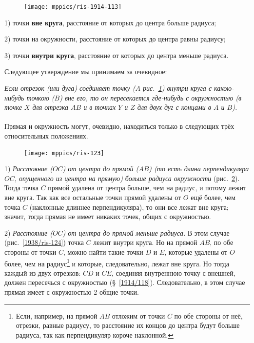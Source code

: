 \documentclass[twoside]{book}
\makeatletter
\newcommand{\rindex}[2][\imki@jobname]{%
  \index[#1]{\detokenize{#2}}%
}
\makeatother
\begin{document}
\begin{figure}
\centering
\texttt{[image: mppics/ris-1914-113]}
\caption{}\label{1914/ris-113}
\end{figure}


1) точки \rindex{внешние точки круга}\textbf{вне круга}, расстояние от которых до центра больше радиуса; 

2) точки на окружности, расстояние от которых до центра равны радиусу; 

3) точки \rindex{внутренние точки круга}\textbf{внутри круга}, расстояние от которых до центра меньше радиуса. 

Следующее утверждение мы принимаем за очевидное:

\emph{Если отрезок (или дуга) соединяет точку \emph{($A$ рис.~\ref{1914/ris-113})} внутри круга с какою-нибудь точкою \emph{($B$)} вне его, то он пересекается где-нибудь с окружностью \emph{(в точке $X$ для отрезка $AB$ и в точках $Y$ и $Z$ для двух дуг с концами в $A$ и $B$)}.}



\paragraph{}\label{1938/112}
Прямая и окружность могут, очевидно, находиться только в следующих трёх относительных положениях.

\begin{figure}
\centering
\texttt{[image: mppics/ris-123]}
\caption{}\label{1938/ris-123}
\end{figure}

1) \emph{Расстояние \emph{($OC$)} от центра до прямой \emph{($AB$) (то есть длина перпендикуляра $OC$, опущенного из центра на прямую)} больше радиуса окружности} (рис.~\ref{1938/ris-123}).
Тогда точка $C$ прямой удалена от центра больше, чем на радиус, и потому лежит вне круга.
Так как все остальные точки прямой удалены от $O$ ещё более, чем точка $C$ (наклонные длиннее перпендикуляра), то они все лежат вне круга;
значит, тогда прямая не имеет никаких точек, общих с окружностью.

2) \emph{Расстояние \emph{($OC$)} от центра до прямой меньше радиуса.}
В этом случае (рис.~\ref{1938/ris-124}) точка $C$ лежит внутри круга. 
Но на прямой $AB$, по обе стороны от точки $C$, можно найти такие точки $D$ и $E$, которые удалены от $O$ более, чем на радиус\footnote{Если, например, на прямой $AB$ отложим от точки $C$ по обе стороны от неё, отрезки, равные радиусу, то расстояние их концов до центра будут больше радиуса, так как перпендикуляр короче наклонной.}
и которые, следовательно, лежат вне круга.
Но тогда каждый из двух отрезков: $CD$ и $CE$, соединяя внутреннюю точку с внешней, должен пересечься с окружностью (§~\ref{1914/118}).
Следовательно, в этом случае прямая имеет с окружностью 2 общие точки.
\end{document}
